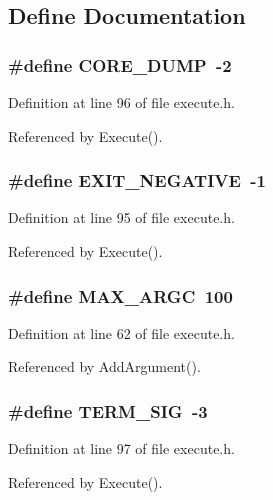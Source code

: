\subsection{Define Documentation}
\subsubsection{\setlength{\rightskip}{0pt plus 5cm}\#define CORE\_\-DUMP~-2}\label{execute_8h_70dc83700b4d84872790e3ce06f6a498}




Definition at line 96 of file execute.h.

Referenced by Execute().
\subsubsection{\setlength{\rightskip}{0pt plus 5cm}\#define EXIT\_\-NEGATIVE~-1}\label{execute_8h_e17cad6fe823a630157255a52cfbada0}




Definition at line 95 of file execute.h.

Referenced by Execute().
\subsubsection{\setlength{\rightskip}{0pt plus 5cm}\#define MAX\_\-ARGC~100}\label{execute_8h_e1da50c0d24fa0390a6c287d6cb4befe}




Definition at line 62 of file execute.h.

Referenced by Add\-Argument().
\subsubsection{\setlength{\rightskip}{0pt plus 5cm}\#define TERM\_\-SIG~-3}\label{execute_8h_c22a3519676c15358e32690519e3844b}




Definition at line 97 of file execute.h.

Referenced by Execute().

